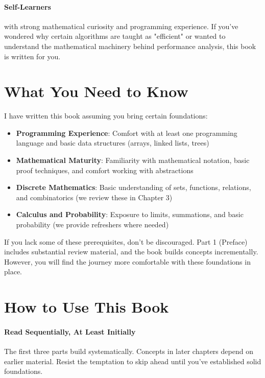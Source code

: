 \paragraph{Self-Learners} with strong mathematical curiosity and programming experience. If you've wondered why certain algorithms are taught as "efficient" or wanted to understand the mathematical machinery behind performance analysis, this book is written for you.

\section*{What You Need to Know}

I have written this book assuming you bring certain foundations:

\begin{itemize}
    \item \textbf{Programming Experience}: Comfort with at least one programming language and basic data structures (arrays, linked lists, trees)
    \item \textbf{Mathematical Maturity}: Familiarity with mathematical notation, basic proof techniques, and comfort working with abstractions
    \item \textbf{Discrete Mathematics}: Basic understanding of sets, functions, relations, and combinatorics (we review these in Chapter 3)
    \item \textbf{Calculus and Probability}: Exposure to limits, summations, and basic probability (we provide refreshers where needed)
\end{itemize}

If you lack some of these prerequisites, don't be discouraged. Part 1 (Preface) includes substantial review material, and the book builds concepts incrementally. However, you will find the journey more comfortable with these foundations in place.

\section*{How to Use This Book}

\paragraph{Read Sequentially, At Least Initially} The first three parts build systematically. Concepts in later chapters depend on earlier material. Resist the temptation to skip ahead until you've established solid foundations.

